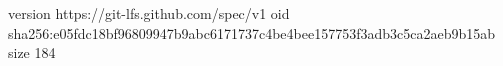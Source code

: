 version https://git-lfs.github.com/spec/v1
oid sha256:e05fdc18bf96809947b9abc6171737c4be4bee157753f3adb3c5ca2aeb9b15ab
size 184
